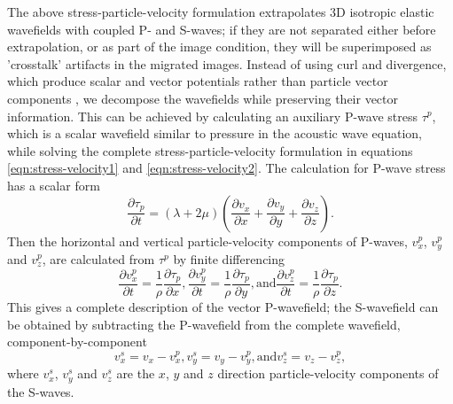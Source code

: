 \documentclass[manuscript,ulem,graphix,revised]{geophysics}
\begin{document}
The above stress-particle-velocity formulation extrapolates 3D isotropic elastic wavefields with coupled P- and S-waves; if they are not separated either before extrapolation, or as part of the image condition, they will be superimposed as 'crosstalk' artifacts in the migrated images. Instead of using curl and divergence, which produce scalar and vector potentials rather than particle vector components \citep{aki80,yan08}, we decompose the wavefields while preserving their vector information. This can be achieved by calculating an auxiliary P-wave stress $\tau^p$, which is a scalar wavefield similar to pressure in the acoustic wave equation, while solving the complete stress-particle-velocity formulation in equations \ref{eqn:stress-velocity1} and \ref{eqn:stress-velocity2}. The calculation for P-wave stress has a scalar form \citep{xiao10} 
\begin{equation}
\frac{\partial\tau_{p}}{\partial t}=(\lambda+2\mu)(\frac{\partial v_x}{\partial x}+\frac{\partial v_y}{\partial y}+\frac{\partial v_z}{\partial z}).
\label{eqn:tau-p}
\end{equation}
Then the horizontal and vertical particle-velocity components of P-waves, $v^p_{x}$, $v^p_{y}$ and $v^p_{z}$, are calculated from $\tau^p$ by finite differencing
\begin{subequations}
\begin{equation}
\frac{\partial v^p_{x}}{\partial t}=\frac{1}{\rho}\frac{\partial\tau _{p}}{\partial x},
\end{equation}
\begin{equation}
\frac{\partial v^p_{y}}{\partial t}=\frac{1}{\rho}\frac{\partial\tau _{p}}{\partial y},
\end{equation}
\text{and}
\begin{equation}
\frac{\partial v^p_{z}}{\partial t}=\frac{1}{\rho}\frac{\partial\tau _{p}}{\partial z}.
\end{equation}
\label{eqn:vp}
\end{subequations}
This gives a complete description of the vector P-wavefield; the S-wavefield can be obtained by subtracting the P-wavefield from the complete wavefield, component-by-component
\begin{subequations}
\begin{equation}
v^s_{x}=v_x-v^p_{x},
\end{equation}
\begin{equation}
v^s_{y}=v_y-v^p_{y},
\end{equation}
\text{and}
\begin{equation}
v^s_{z}=v_z-v^p_{z},
\end{equation}
\label{eqn:vs}
\end{subequations}
where $v^s_x$,  $v^s_y$ and $v^s_z$ are the $x$, $y$ and $z$ direction particle-velocity components of the S-waves. 
\end{document}
